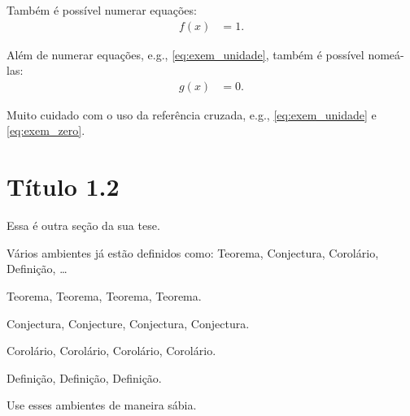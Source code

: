Tamb\'{e}m \'{e} possível numerar equa\c{c}\~{o}es:
\begin{align}
    f(x) &= 1.
    \label{eq:exem_unidade}
\end{align}

Al\'{e}m de numerar equa\c{c}\~{o}es, e.g., \eqref{eq:exem_unidade}, tamb\'{e}m \'{e}
possível nome\'a-las:
\begin{align}
    g(x) &= 0.
    \tag{EIN}
    \label{eq:exem_zero}
\end{align}

Muito cuidado com o uso da refer\^{e}ncia cruzada, e.g.,
\eqref{eq:exem_unidade} e \eqref{eq:exem_zero}.

\section{Título 1.2}
Essa \'{e} outra se\c{c}\~{a}o da sua tese.

Vários ambientes já est\~{a}o definidos como: Teorema, Conjectura, Corolário,
Defini\c{c}\~{a}o, \ldots

\begin{thm}
Teorema, Teorema, Teorema, Teorema.
\end{thm}

\begin{con}
Conjectura, Conjecture, Conjectura, Conjectura.
\end{con}

\begin{cor}
Corolário, Corolário, Corolário, Corolário.
\end{cor}

\begin{dfn}
Defini\c{c}\~{a}o, Defini\c{c}\~{a}o, Defini\c{c}\~{a}o.
\end{dfn}

Use esses ambientes de maneira sábia.
